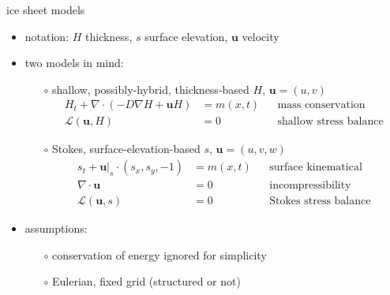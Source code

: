 \documentclass[hide notes,intlimits,usenames,dvipsnames]{beamer}
\newcommand{\Div}{\nabla\cdot}
\newcommand{\grad}{\nabla}
\begin{document}
\begin{frame}{ice sheet models}

\begin{itemize}
\item notation: $H$ thickness, $s$ surface elevation, $\mathbf{u}$ velocity
\item two models in mind:
    \begin{itemize}
    \item[$\circ$] shallow, possibly-hybrid, thickness-based \hfill {\scriptsize\color{Gray} $H,\, \mathbf{u}=(u,v)$}
        \begin{align*}
        H_t + \Div (-D \grad H + \mathbf{u} H) &= m(x,t) && \text{mass conservation} \\
        \mathcal{L}(\mathbf{u},H) &= 0      && \text{shallow stress balance}
        \end{align*}
    \item[$\circ$] Stokes, surface-elevation-based \hfill {\scriptsize\color{Gray} $s,\, \mathbf{u}=(u,v,w)$}
        \begin{align*}
        s_t + \mathbf{u}\big|_s \cdot (s_x,s_y,-1) &= m(x,t) && \text{surface kinematical} \\
        \Div \mathbf{u} &= 0            && \text{incompressibility} \\
        \mathcal{L}(\mathbf{u},s) &= 0  && \text{Stokes stress balance}
        \end{align*}
    \end{itemize}
\item assumptions:
    \begin{itemize}
    \item[$\circ$] conservation of energy ignored for simplicity
    \item[$\circ$] Eulerian, fixed grid (structured or not)
    \end{itemize}
\end{itemize}
\end{frame}
\end{document}
